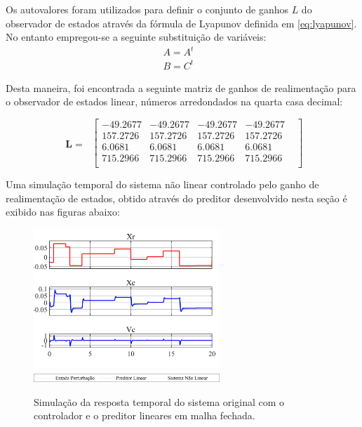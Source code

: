 \documentclass[a4paper]{ifacconf}
\begin{document}
    Os autovalores foram utilizados para definir o conjunto de ganhos $L$ do observador de estados através da fórmula de Lyapunov definida em \ref{eq:lyapunov}. No entanto empregou-se a seguinte substituição de variáveis:
    \begin{equation} \label{eq:var_pred}
        \begin{split}
        A = A^{t}&\\
        B = C^{t}&
        \end{split}
    \end{equation}

    Desta maneira, foi encontrada a seguinte matriz de ganhos de realimentação para o observador de estados linear, números arredondados na quarta casa decimal:

    \begin{equation} \label{eq:ganhos_pred}
        \begin{split}
            \mathbf{L}=\
        \end{split}
        \begin{bmatrix}
          -49.2677& -49.2677& -49.2677& -49.2677&\\
          157.2726& 157.2726& 157.2726& 157.2726&\\
            6.0681&   6.0681&   6.0681&   6.0681&\\
          715.2966& 715.2966& 715.2966& 715.2966&\\
        \end{bmatrix}
    \end{equation}

    Uma simulação temporal do sistema não linear controlado pelo ganho de realimentação de estados, obtido através do preditor desenvolvido nesta seção é exibido nas figuras abaixo:

    \FloatBarrier
    \begin{figure}[htbp]
        \begin{centering}
            \includegraphics[width=7cm]{img/simulaca_temporal_preditor_linear.png}
            \includegraphics[width=7cm]{img/simulaca_temporal_preditor_linear_erro_leg.png}
            \caption{Simulação da resposta temporal do sistema original com o controlador e o preditor lineares em malha fechada.}
            \label{fig:simulaca_temporal_preditor_linear}
        \end{centering}
    \end{figure}
    \FloatBarrier
\end{document}
